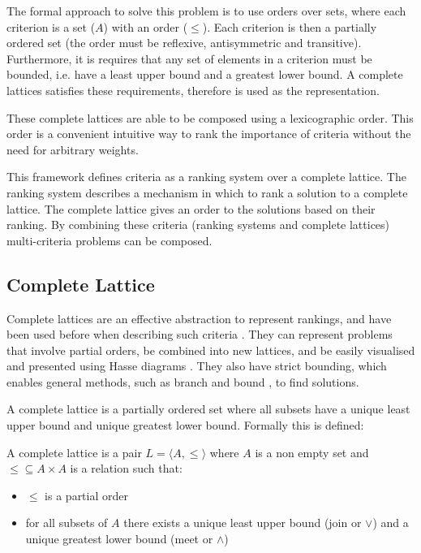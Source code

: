 The formal approach to solve this problem is to use orders over sets, 
where each criterion is a set ($A$) with an order ($\leq$).
Each criterion is then a partially ordered set (the order must be reflexive, antisymmetric and transitive).
Furthermore, it is requires that any set of elements in a criterion must be bounded, 
i.e. have a least upper bound and a greatest lower bound.
A complete lattices satisfies these requirements, therefore is used as the representation. 

These complete lattices are able to be composed using a lexicographic order.
This order is a convenient intuitive way to rank the importance of criteria without the need for arbitrary weights.

This framework defines criteria as a ranking system over a complete lattice.
The ranking system describes a mechanism in which to rank a solution to a complete lattice. 
The complete lattice gives an order to the solutions based on their ranking.
By combining these criteria (ranking systems and complete lattices) multi-criteria problems can be composed.

\subsection{Complete Lattice}
Complete lattices are an effective abstraction to represent rankings,
and have been used before when describing such criteria \cite{Bistarelli1997,Fernandez}.
They can represent problems that involve partial orders,
be combined into new lattices,
and be easily visualised and presented using Hasse diagrams \cite{davey1990introduction}.
They also have strict bounding, which enables general methods, such as branch and bound \cite{Land1960}, to find solutions.

A complete lattice is a partially ordered set where all subsets have a unique least upper bound and unique greatest lower bound.
Formally this is defined:
\begin{defs}
A complete lattice is a pair $L = \langle A, \leq \rangle$ where $A$ is a non empty set 
and $\leq \subseteq A \times A$ is a relation such that:
\begin{itemize}
  \item $\leq$ is a partial order
  \item for all subsets of $A$ there exists a unique least upper bound (join or $\vee$) and a unique greatest lower bound (meet or $\wedge$)
\end{itemize}
\end{defs}


